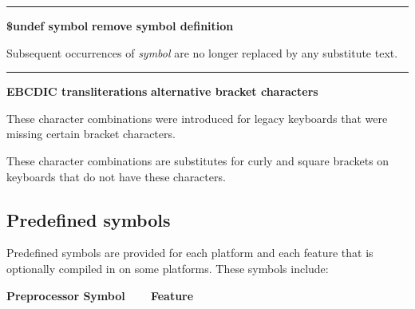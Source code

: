 \bigskip\hrule\vspace{0.1cm}
\noindent
{\bf \$undef symbol } \hfill {\bf remove symbol definition}

\noindent
{}Subsequent occurrences of \textit{symbol} are no longer
replaced by any substitute text.

\bigskip\hrule\vspace{0.1cm}
\noindent
{\bf EBCDIC transliterations } \hfill {\bf alternative bracket characters}

\noindent
These character combinations were introduced for legacy keyboards that
were missing certain bracket characters.


These character combinations are substitutes for curly and square
brackets on keyboards that do not have these characters.

\subsection*{Predefined symbols}

Predefined symbols are provided for each
platform and each feature that is optionally compiled in on some
platforms. These symbols include:

{\bfseries Preprocessor Symbol\ \ \ \ Feature}

